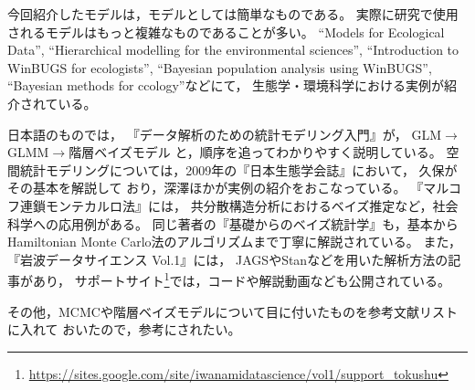 \documentclass[11pt,uplatex]{jsarticle}
\begin{document}
今回紹介したモデルは，モデルとしては簡単なものである。
実際に研究で使用されるモデルはもっと複雑なものであることが多い。
``Models for Ecological Data''\cite{Clark},
``Hierarchical modelling for the environmental sciences''\cite{Clark_Gelfand},
``Introduction to WinBUGS for ecologists''\cite{IWE},
``Bayesian population analysis using WinBUGS''\cite{BPA},
``Bayesian methods for ccology''\cite{McCarthy}などにて，
生態学・環境科学における実例が紹介されている。

日本語のものでは，
『データ解析のための統計モデリング入門』\cite{Kubo:Modeling}が，
GLM$\rightarrow$GLMM$\rightarrow$階層ベイズモデル
と，順序を追ってわかりやすく説明している。
空間統計モデリングについては，2009年の『日本生態学会誌』において，
久保\cite{Kubo}がその基本を解説して
おり，深澤ほか\cite{Fukasawa_et_al}が実例の紹介をおこなっている。
『マルコフ連鎖モンテカルロ法』\cite{Toyoda}には，
共分散構造分析におけるベイズ推定など，社会科学への応用例がある。
同じ著者の『基礎からのベイズ統計学』\cite{Toyoda2015}も，基本から
Hamiltonian Monte Carlo法のアルゴリズムまで丁寧に解説されている。
また，『岩波データサイエンス Vol.1』\cite{Iwanami_vol1}には，
\textsf{JAGS}や\textsf{Stan}などを用いた解析方法の記事があり，
サポートサイト\footnote{\url{https://sites.google.com/site/iwanamidatascience/vol1/support_tokushu}}では，コードや解説動画なども公開されている。


その他，MCMCや階層ベイズモデルについて目に付いたものを参考文献リストに入れて
おいたので，参考にされたい。

\end{document}
